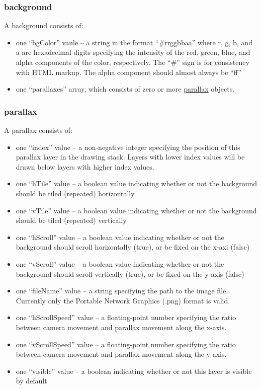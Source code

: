 \documentclass[12pt,letterpaper]{article}
\begin{document}
\subsubsection*{background}
\label{sec:background}
A background consists of:
\begin{itemize}
	\item one ``bgColor'' vaule -- a string in the format ``\#rrggbbaa'' where
		r, g, b, and a are hexadecimal digits specifying the intensity of the
		red, green, blue, and alpha components of the color, respectively. The
		``\#'' sign is for consistency with HTML markup. The alpha component
		should almost always be ``ff''
	\item one ``parallaxes'' array, which consists of zero or more
		\hyperref[sec:parallax]{parallax} objects.
\end{itemize}

\subsubsection*{parallax}
\label{sec:parallax}
A parallax consists of:
\begin{itemize}
	\item one ``index'' value -- a non-negative integer specifying the position of
		this parallax layer in the drawing stack. Layers with lower index values
		will be drawn below layers with higher index values.
	\item one ``hTile'' value -- a boolean value indicating whether or not the
		background should be tiled (repeated) horizontally.
	\item one ``vTile'' value -- a boolean value indicating whether or not the
		background should be tiled (repeated) vertically.
	\item one ``hScroll'' value -- a boolean value indicating whether or not the
		background should scroll horizontally (true), or be fixed on the x-axi
		(false)
	\item one ``vScroll'' value -- a boolean value indicating whether or not the
		background should scroll vertically (true), or be fixed on the y-axis
		(false)
	\item one ``fileName'' value -- a string specifying the path to the image
		file. Currently only the Portable Network Graphics (.png) format is
		valid.
	\item one ``hScrollSpeed'' value -- a floating-point number specifying the
		ratio between camera movement and parallax movement along the x-axis.
	\item one ``vScrollSpeed'' value -- a floating-point number specifying the
		ratio between camera movement and parallax movement along the y-axis.
	\item one ``visible'' value -- a boolean indicating whether or not this layer
		is visible by default
\end{itemize}
\end{document}
